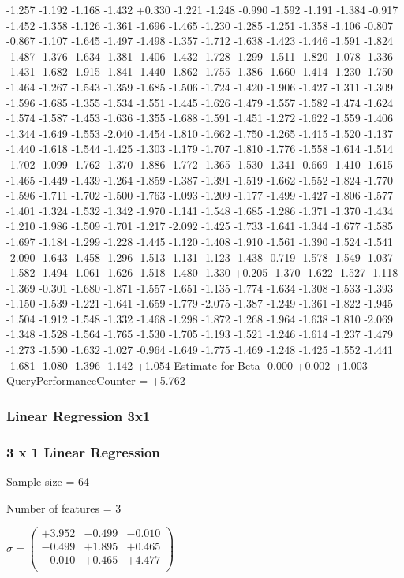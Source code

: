 \documentclass[9pt]{article}
\theoremstyle{plain}
\theoremstyle{definition}
\theoremstyle{remark}
\numberwithin{equation}{section}
\begin{document}
-1.257
-1.192
-1.168
-1.432
+0.330
-1.221
-1.248
-0.990
-1.592
-1.191
-1.384
-0.917
-1.452
-1.358
-1.126
-1.361
-1.696
-1.465
-1.230
-1.285
-1.251
-1.358
-1.106
-0.807
-0.867
-1.107
-1.645
-1.497
-1.498
-1.357
-1.712
-1.638
-1.423
-1.446
-1.591
-1.824
-1.487
-1.376
-1.634
-1.381
-1.406
-1.432
-1.728
-1.299
-1.511
-1.820
-1.078
-1.336
-1.431
-1.682
-1.915
-1.841
-1.440
-1.862
-1.755
-1.386
-1.660
-1.414
-1.230
-1.750
-1.464
-1.267
-1.543
-1.359
-1.685
-1.506
-1.724
-1.420
-1.906
-1.427
-1.311
-1.309
-1.596
-1.685
-1.355
-1.534
-1.551
-1.445
-1.626
-1.479
-1.557
-1.582
-1.474
-1.624
-1.574
-1.587
-1.453
-1.636
-1.355
-1.688
-1.591
-1.451
-1.272
-1.622
-1.559
-1.406
-1.344
-1.649
-1.553
-2.040
-1.454
-1.810
-1.662
-1.750
-1.265
-1.415
-1.520
-1.137
-1.440
-1.618
-1.544
-1.425
-1.303
-1.179
-1.707
-1.810
-1.776
-1.558
-1.614
-1.514
-1.702
-1.099
-1.762
-1.370
-1.886
-1.772
-1.365
-1.530
-1.341
-0.669
-1.410
-1.615
-1.465
-1.449
-1.439
-1.264
-1.859
-1.387
-1.391
-1.519
-1.662
-1.552
-1.824
-1.770
-1.596
-1.711
-1.702
-1.500
-1.763
-1.093
-1.209
-1.177
-1.499
-1.427
-1.806
-1.577
-1.401
-1.324
-1.532
-1.342
-1.970
-1.141
-1.548
-1.685
-1.286
-1.371
-1.370
-1.434
-1.210
-1.986
-1.509
-1.701
-1.217
-2.092
-1.425
-1.733
-1.641
-1.344
-1.677
-1.585
-1.697
-1.184
-1.299
-1.228
-1.445
-1.120
-1.408
-1.910
-1.561
-1.390
-1.524
-1.541
-2.090
-1.643
-1.458
-1.296
-1.513
-1.131
-1.123
-1.438
-0.719
-1.578
-1.549
-1.037
-1.582
-1.494
-1.061
-1.626
-1.518
-1.480
-1.330
+0.205
-1.370
-1.622
-1.527
-1.118
-1.369
-0.301
-1.680
-1.871
-1.557
-1.651
-1.135
-1.774
-1.634
-1.308
-1.533
-1.393
-1.150
-1.539
-1.221
-1.641
-1.659
-1.779
-2.075
-1.387
-1.249
-1.361
-1.822
-1.945
-1.504
-1.912
-1.548
-1.332
-1.468
-1.298
-1.872
-1.268
-1.964
-1.638
-1.810
-2.069
-1.348
-1.528
-1.564
-1.765
-1.530
-1.705
-1.193
-1.521
-1.246
-1.614
-1.237
-1.479
-1.273
-1.590
-1.632
-1.027
-0.964
-1.649
-1.775
-1.469
-1.248
-1.425
-1.552
-1.441
-1.681
-1.080
-1.396
-1.142
+1.054
Estimate for Beta
-0.000
+0.002
+1.003
QueryPerformanceCounter  =  +5.762
\subsubsection{Linear Regression 3x1}
\subsubsection{3 x 1 Linear Regression}
Sample size = 64

Number of features = 3

$\sigma = \left(
\begin{array}{
ccc}
+3.952 & -0.499 & -0.010 \\
-0.499 & +1.895 & +0.465 \\
-0.010 & +0.465 & +4.477 \\
\end{array}
\right)$ \newline 
\end{document}
